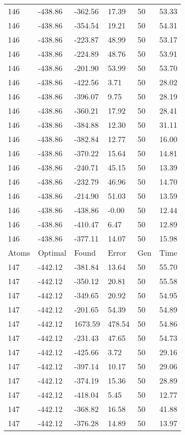 \documentclass{report}
\begin{document}
\begin{appendix}
\begin{longtable}{llllll}
146 & -438.86 & -362.56 & 17.39 & 50 & 53.33 \\
146 & -438.86 & -354.54 & 19.21 & 50 & 54.31 \\
146 & -438.86 & -223.87 & 48.99 & 50 & 53.17 \\
146 & -438.86 & -224.89 & 48.76 & 50 & 53.91 \\
146 & -438.86 & -201.90 & 53.99 & 50 & 53.70 \\
146 & -438.86 & -422.56 & 3.71 & 50 & 28.02 \\
146 & -438.86 & -396.07 & 9.75 & 50 & 28.19 \\
146 & -438.86 & -360.21 & 17.92 & 50 & 28.41 \\
146 & -438.86 & -384.88 & 12.30 & 50 & 31.11 \\
146 & -438.86 & -382.84 & 12.77 & 50 & 16.00 \\
146 & -438.86 & -370.22 & 15.64 & 50 & 14.81 \\
146 & -438.86 & -240.71 & 45.15 & 50 & 13.39 \\
146 & -438.86 & -232.79 & 46.96 & 50 & 14.70 \\
146 & -438.86 & -214.90 & 51.03 & 50 & 13.59 \\
146 & -438.86 & -438.86 & -0.00 & 50 & 12.44 \\
146 & -438.86 & -410.47 & 6.47 & 50 & 12.89 \\
146 & -438.86 & -377.11 & 14.07 & 50 & 15.98 \\
Atoms & Optimal & Found & Error & Gen & Time \\
147 & -442.12 & -381.84 & 13.64 & 50 & 55.70 \\
147 & -442.12 & -350.12 & 20.81 & 50 & 55.58 \\
147 & -442.12 & -349.65 & 20.92 & 50 & 54.95 \\
147 & -442.12 & -201.65 & 54.39 & 50 & 54.89 \\
147 & -442.12 & 1673.59 & 478.54 & 50 & 54.86 \\
147 & -442.12 & -231.43 & 47.65 & 50 & 54.73 \\
147 & -442.12 & -425.66 & 3.72 & 50 & 29.16 \\
147 & -442.12 & -397.14 & 10.17 & 50 & 29.06 \\
147 & -442.12 & -374.19 & 15.36 & 50 & 28.89 \\
147 & -442.12 & -418.04 & 5.45 & 50 & 12.77 \\
147 & -442.12 & -368.82 & 16.58 & 50 & 41.88 \\
147 & -442.12 & -376.28 & 14.89 & 50 & 13.97 \\

\end{longtable}
\end{appendix}
\end{document}
